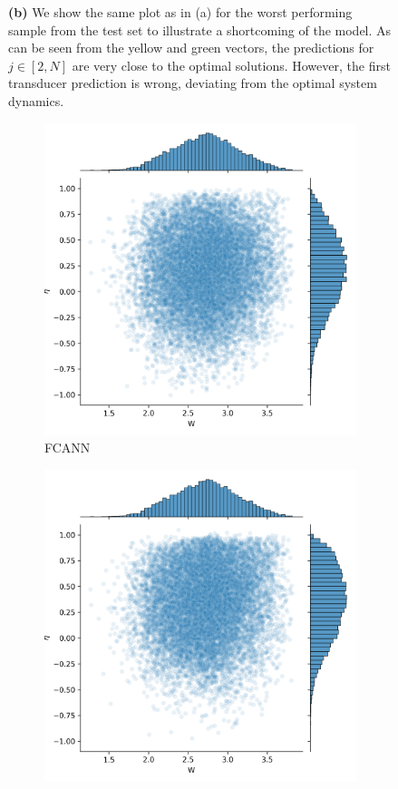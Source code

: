 \begin{figure}
{	\textbf{(b)} We show the same plot as in (a) for the worst performing sample from the test set to illustrate a shortcoming of the model. As can be seen from the yellow and green vectors, the predictions for $j \in [2, N]$ are very close to the optimal solutions. However, the first transducer prediction is wrong, deviating from the optimal system dynamics.}
\end{figure}

\begin{figure}
	\centering
	\begin{subfigure}{0.32\textwidth}
		\centering
		\includegraphics[width=\textwidth]{img/work_dist_n5_eigen_ann}
		\caption{FCANN}
		\label{}
	\end{subfigure}
	\begin{subfigure}{0.32\textwidth}
		\centering
		\includegraphics[width=\textwidth]{img/work_dist_n5_eigen_bi}

\end{subfigure}
\end{figure}
